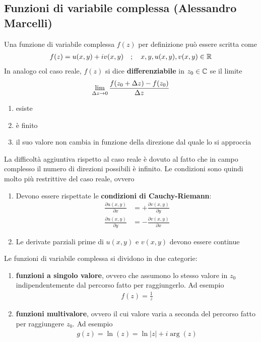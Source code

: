 \newpage

\subsection{Funzioni di variabile complessa (Alessandro Marcelli)}

Una funzione di variabile complessa $f(z)$ per definizione può essere scritta come
\begin{align}
	f(z) = u(x,y) + i v(x,y) \quad ; \quad x,y, u(x,y), v(x,y) \in \mathbb{R}
\end{align}
In analogo col caso reale, $f(z)$ si dice \textbf{differenziabile}\cite{MfP} in $z_0 \in \mathbb{C}$ se il limite
\begin{align}
	\underset{\Delta z \rightarrow 0}{\lim} \, \frac{f(z_0 + \Delta z) - f(z_0)}{\Delta z}
\end{align}
\begin{enumerate}
	\item esiste
	\item è finito
	\item il suo valore non cambia in funzione della direzione dal quale lo si approccia
\end{enumerate}
La difficoltà aggiuntiva rispetto al caso reale è dovuto al fatto che in campo complesso il numero di direzioni possibili è infinito. Le condizioni sono quindi molto più restrittive del caso reale, ovvero
\begin{enumerate}
	\item Devono essere rispettate le \textbf{condizioni di Cauchy-Riemann}:
	\begin{align}
		\frac{\partial u(x,y)}{\partial x} &= +\frac{\partial v(x,y)}{\partial y}\\
		\frac{\partial u(x,y)}{\partial y} &= -\frac{\partial v(x,y)}{\partial x}		
	\end{align}
	\item Le derivate parziali prime di $u(x,y)$ e $v(x,y)$ devono essere continue
\end{enumerate}

Le funzioni di variabile complessa si dividono in due categorie:
\begin{enumerate}
	\item \textbf{funzioni a singolo valore}, ovvero che assumono lo stesso valore in $z_0$ indipendentemente dal percorso fatto per raggiungerlo. Ad esempio
	\begin{align}
		f(z) = \frac{1}{z}
	\end{align}
	\item \textbf{funzioni multivalore}, ovvero il cui valore varia a seconda del percorso fatto per raggiungere $z_0$. Ad esempio
	\begin{align}
		g(z) = \ln(z) = \ln |z| + i \arg (z)
	\end{align}
\end{enumerate}

